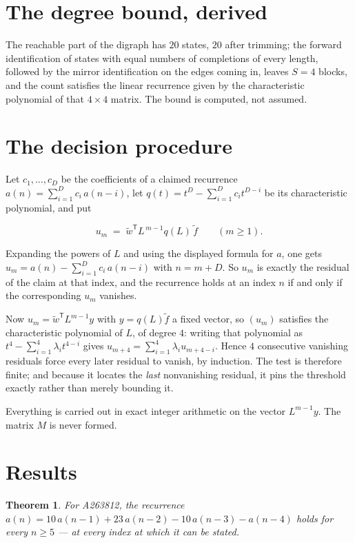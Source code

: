 \documentclass[11pt]{article}
\newtheorem{theorem}{Theorem}
\theoremstyle{definition}
\begin{document}
\section{The degree bound, derived}

The reachable part of the digraph has $20$ states, $20$ after trimming; the forward identification of states with equal numbers of completions of every length, followed by the mirror identification on the edges coming in, leaves $S = 4$ blocks, and the count satisfies the linear recurrence given by the characteristic polynomial of that $4\times4$ matrix. The bound is computed, not assumed.

\section{The decision procedure}

Let $c_1,\dots,c_D$ be the coefficients of a claimed recurrence $a(n) = \sum_{i=1}^{D} c_i\,a(n-i)$, let $q(t) = t^{D} - \sum_{i=1}^{D} c_i t^{D-i}$ be its characteristic polynomial, and put

\[u_m \;=\; \tilde w^{\mathsf T} L^{\,m-1} q(L)\,\tilde f \qquad (m \ge 1).\]

Expanding the powers of $L$ and using the displayed formula for $a$, one gets $u_m = a(n) - \sum_{i=1}^{D} c_i\,a(n-i)$ with $n = m + D$. So $u_m$ is exactly the residual of the claim at that index, and the recurrence holds at an index $n$ if and only if the corresponding $u_m$ vanishes.

Now $u_m = \tilde w^{\mathsf T} L^{m-1} y$ with $y = q(L)\tilde f$ a fixed vector, so $(u_m)$ satisfies the characteristic polynomial of $L$, of degree $4$: writing that polynomial as $t^{4} - \sum_{i=1}^{4} \lambda_i t^{4-i}$ gives $u_{m+4} = \sum_{i=1}^{4} \lambda_i u_{m+4-i}$. Hence $4$ consecutive vanishing residuals force every later residual to vanish, by induction. The test is therefore finite; and because it locates the {\itshape last} nonvanishing residual, it pins the threshold exactly rather than merely bounding it.

Everything is carried out in exact integer arithmetic on the vector $L^{m-1}y$. The matrix $M$ is never formed.

\section{Results}

\begin{theorem} For A263812, the recurrence $a(n) = 10\,a(n-1) + 23\,a(n-2) - 10\,a(n-3) - a(n-4)$ holds for every $n \ge 5$ --- at every index at which it can be stated.\end{theorem}
\end{document}
